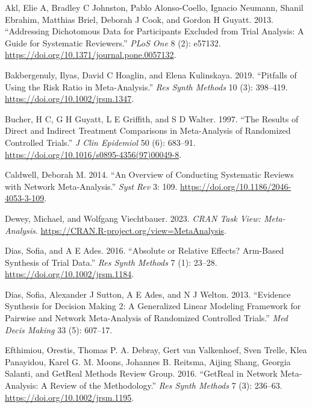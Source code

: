 \hypertarget{refs}{}
\begin{CSLReferences}{1}{0}
\leavevmode{}%
Akl, Elie A, Bradley C Johnston, Pablo Alonso-Coello, Ignacio Neumann, Shanil Ebrahim, Matthias Briel, Deborah J Cook, and Gordon H Guyatt. 2013. {``Addressing Dichotomous Data for Participants Excluded from Trial Analysis: A Guide for Systematic Reviewers.''} \emph{PLoS One} 8 (2): e57132. \url{https://doi.org/10.1371/journal.pone.0057132}.

\leavevmode{}%
Bakbergenuly, Ilyas, David C Hoaglin, and Elena Kulinskaya. 2019. {``Pitfalls of Using the Risk Ratio in Meta-Analysis.''} \emph{Res Synth Methods} 10 (3): 398--419. \url{https://doi.org/10.1002/jrsm.1347}.

\leavevmode{}%
Bucher, H C, G H Guyatt, L E Griffith, and S D Walter. 1997. {``The Results of Direct and Indirect Treatment Comparisons in Meta-Analysis of Randomized Controlled Trials.''} \emph{J Clin Epidemiol} 50 (6): 683--91. \url{https://doi.org/10.1016/s0895-4356(97)00049-8}.

\leavevmode{}%
Caldwell, Deborah M. 2014. {``An Overview of Conducting Systematic Reviews with Network Meta-Analysis.''} \emph{Syst Rev} 3: 109. \url{https://doi.org/10.1186/2046-4053-3-109}.

\leavevmode{}%
Dewey, Michael, and Wolfgang Viechtbauer. 2023. \emph{{CRAN Task View}: Meta-Analysis}. \url{https://CRAN.R-project.org/view=MetaAnalysis}.

\leavevmode{}%
Dias, Sofia, and A E Ades. 2016. {``Absolute or Relative Effects? Arm-Based Synthesis of Trial Data.''} \emph{Res Synth Methods} 7 (1): 23--28. \url{https://doi.org/10.1002/jrsm.1184}.

\leavevmode{}%
Dias, Sofia, Alexander J Sutton, A E Ades, and N J Welton. 2013. {``Evidence Synthesis for Decision Making 2: A Generalized Linear Modeling Framework for Pairwise and Network Meta-Analysis of Randomized Controlled Trials.''} \emph{Med Decis Making} 33 (5): 607--17.

\leavevmode{}%
Efthimiou, Orestis, Thomas P. A. Debray, Gert van Valkenhoef, Sven Trelle, Klea Panayidou, Karel G. M. Moons, Johannes B. Reitsma, Aijing Shang, Georgia Salanti, and GetReal Methods Review Group. 2016. {``GetReal in Network Meta-Analysis: A Review of the Methodology.''} \emph{Res Synth Methods} 7 (3): 236--63. \url{https://doi.org/10.1002/jrsm.1195}.


\end{CSLReferences}
